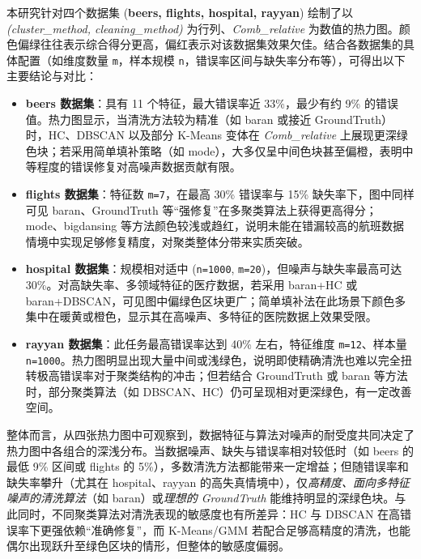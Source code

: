 \documentclass[10pt]{article} %
\numberwithin{equation}{section}
\begin{document}
\begin{enumerate}[label=(\alph*)]
本研究针对四个数据集 (\textbf{beers, flights, hospital, rayyan}) 绘制了以 \textit{(cluster\_method, cleaning\_method)} 为行列、\textit{Comb\_relative} 为数值的热力图。颜色偏绿往往表示综合得分更高，偏红表示对该数据集效果欠佳。结合各数据集的具体配置（如维度数量 \texttt{m}，样本规模 \texttt{n}，错误率区间与缺失率分布等），可得出以下主要结论与对比：

\begin{itemize}
    \item \textbf{beers 数据集}：具有 11 个特征，最大错误率近 33\%，最少有约 9\% 的错误值。热力图显示，当清洗方法较为精准（如 baran 或接近 GroundTruth）时，HC、DBSCAN 以及部分 K-Means 变体在 \textit{Comb\_relative} 上展现更深绿色块；若采用简单填补策略（如 mode），大多仅呈中间色块甚至偏橙，表明中等程度的错误修复对高噪声数据贡献有限。

    \item \textbf{flights 数据集}：特征数 \texttt{m=7}，在最高 30\% 错误率与 15\% 缺失率下，图中同样可见 baran、GroundTruth 等“强修复”在多聚类算法上获得更高得分；mode、bigdansing 等方法颜色较浅或趋红，说明未能在错漏较高的航班数据情境中实现足够修复精度，对聚类整体分带来实质突破。

    \item \textbf{hospital 数据集}：规模相对适中 (\texttt{n=1000}, \texttt{m=20})，但噪声与缺失率最高可达 30\%。对高缺失率、多领域特征的医疗数据，若采用 baran+HC 或 baran+DBSCAN，可见图中偏绿色区块更广；简单填补法在此场景下颜色多集中在暖黄或橙色，显示其在高噪声、多特征的医院数据上效果受限。

    \item \textbf{rayyan 数据集}：此任务最高错误率达到 40\% 左右，特征维度 \texttt{m=12}、样本量 \texttt{n=1000}。热力图明显出现大量中间或浅绿色，说明即使精确清洗也难以完全扭转极高错误率对于聚类结构的冲击；但若结合 GroundTruth 或 baran 等方法时，部分聚类算法（如 DBSCAN、HC）仍可呈现相对更深绿色，有一定改善空间。
\end{itemize}

\noindent
整体而言，从四张热力图中可观察到，数据特征与算法对噪声的耐受度共同决定了热力图中各组合的深浅分布。当数据噪声、缺失与错误率相对较低时（如 beers 的最低 9\% 区间或 flights 的 5\%），多数清洗方法都能带来一定增益；但随错误率和缺失率攀升（尤其在 hospital、rayyan 的高失真情境中），仅\textit{高精度、面向多特征噪声的清洗算法}（如 baran）或\textit{理想的 GroundTruth} 能维持明显的深绿色块。与此同时，不同聚类算法对清洗表现的敏感度也有所差异：HC 与 DBSCAN 在高错误率下更强依赖“准确修复”，而 K-Means/GMM 若配合足够高精度的清洗，也能偶尔出现跃升至绿色区块的情形，但整体的敏感度偏弱。


\end{enumerate}
\end{document}

